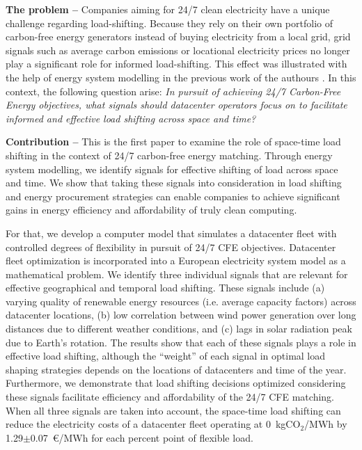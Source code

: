 \textbf{The problem --}
Companies aiming for 24/7 clean electricity have a unique challenge regarding load-shifting. Because they rely on their own portfolio of carbon-free energy generators instead of buying electricity from a local grid, grid signals such as average carbon emissions or locational electricity prices no longer play a significant role for informed load-shifting. This effect was illustrated with the help of energy system modelling in the previous work of the authours \cite{riepin-zenodo-systemlevel247,riepinMeansCostsSystemlevel2023}. In this context, the following question arise: \textit{In pursuit of achieving 24/7 Carbon-Free Energy objectives, what signals should datacenter operators focus on to facilitate informed and effective load shifting across space and time?}

\textbf{Contribution --} This is the first paper to examine the role of space-time load shifting in the context of 24/7 carbon-free energy matching.
Through energy system modelling, we identify signals for effective shifting of load across space and time. We show that taking these signals into consideration in load shifting and energy procurement strategies can enable companies to achieve significant gains in energy efficiency and affordability of truly clean computing.

For that, we develop a computer model that simulates a datacenter fleet with controlled degrees of flexibility in pursuit of 24/7 CFE objectives. Datacenter fleet optimization is incorporated into a European electricity system model as a mathematical problem.
We identify three individual signals that are relevant for effective geographical and temporal load shifting. These signals include (a) varying quality of renewable energy resources (i.e. average capacity factors) across datacenter locations, (b) low correlation between wind power generation over long distances due to different weather conditions, and (c) lags in solar radiation peak due to Earth's rotation. The results show that each of these signals plays a role in effective load shifting, although the \enquote{weight} of each signal in optimal load shaping strategies depends on the locations of datacenters and time of the year.
Furthermore, we demonstrate that load shifting decisions optimized considering these signals facilitate efficiency and affordability of the 24/7 CFE matching. When all three signals are taken into account, the space-time load shifting can reduce the electricity costs of a datacenter fleet operating at 0~kgCO$_2$/MWh by 1.29$\pm$0.07~\euro/MWh for each percent point of flexible load.

